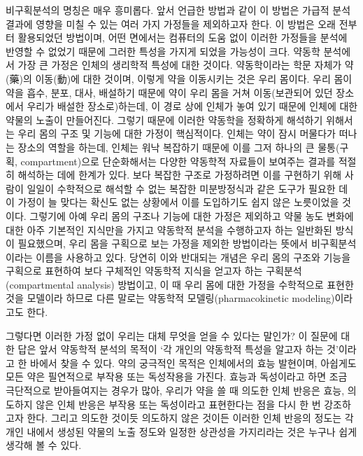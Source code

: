 \documentclass[
  11pt,
  krantz2, a4paper, twoside]{krantz}
\theoremstyle{definition}
\theoremstyle{definition}
\theoremstyle{definition}
\theoremstyle{definition}
\theoremstyle{remark}
\begin{document}
비구획분석의 명칭은 매우 흥미롭다.
앞서 언급한 방법과 같이 이 방법은 가급적 분석결과에 영향을 미칠 수 있는 여러 가지 가정들을 제외하고자 한다.
이 방법은 오래 전부터 활용되었던 방법이며, 어떤 면에서는 컴퓨터의 도움 없이 이러한 가정들을 분석에 반영할 수 없었기 때문에 그러한 특성을 가지게 되었을 가능성이 크다.
약동학 분석에서 가장 큰 가정은 인체의 생리학적 특성에 대한 것이다. 
약동학이라는 학문 자체가 약(藥)의 이동(動)에 대한 것이며, 이렇게 약을 이동시키는 것은 우리 몸이다. 
우리 몸이 약을 흡수, 분포, 대사, 배설하기 때문에 약이 우리 몸을 거쳐 이동(보관되어 있던 장소에서 우리가 배설한 장소로)하는데, 이 경로 상에 인체가 놓여 있기 때문에 인체에 대한 약물의 노출이 만들어진다.
그렇기 때문에 이러한 약동학을 정확하게 해석하기 위해서는 우리 몸의 구조 및 기능에 대한 가정이 핵심적이다. 
인체는 약이 잠시 머물다가 떠나는 장소의 역할을 하는데, 인체는 워낙 복잡하기 때문에 이를 그저 하나의 큰 물통(구획, compartment)으로 단순화해서는 다양한 약동학적 자료들이 보여주는 결과를 적절히 해석하는 데에 한계가 있다. 
보다 복잡한 구조로 가정하려면 이를 구현하기 위해 사람이 일일이 수학적으로 해석할 수 없는 복잡한 미분방정식과 같은 도구가 필요한 데 이 가정이 늘 맞다는 확신도 없는 상황에서 이를 도입하기도 쉽지 않은 노릇이었을 것이다.
그렇기에 아예 우리 몸의 구조나 기능에 대한 가정은 제외하고 약물 농도 변화에 대한 아주 기본적인 지식만을 가지고 약동학적 분석을 수행하고자 하는 일반화된 방식이 필요했으며, 우리 몸을 구획으로 보는 가정을 제외한 방법이라는 뜻에서 비구획분석이라는 이름을 사용하고 있다. 
당연히 이와 반대되는 개념은 우리 몸의 구조와 기능을 구획으로 표현하여 보다 구체적인 약동학적 지식을 얻고자 하는 구획분석(compartmental analysis) 방법이고, 이 때 우리 몸에 대한 가정을 수학적으로 표현한 것을 모델이라 하므로 다른 말로는 약동학적 모델링(pharmacokinetic modeling)이라고도 한다.

그렇다면 이러한 가정 없이 우리는 대체 무엇을 얻을 수 있다는 말인가?
이 질문에 대한 답은 앞서 약동학적 분석의 목적이 `각 개인의 약동학적 특성을 알고자 하는 것'이라고 한 바에서 찾을 수 있다. 
약의 궁극적인 목적은 인체에서의 효능 발현이며, 아쉽게도 모든 약은 필연적으로 부작용 또는 독성작용을 가진다.
효능과 독성이라고 하면 조금 극단적으로 받아들여지는 경우가 많아, 우리가 약을 쓸 때 의도한 인체 반응은 효능, 의도하지 않은 인체 반응은 부작용 또는 독성이라고 표현한다는 점을 다시 한 번 강조하고자 한다.
그리고 의도한 것이듯 의도하지 않은 것이든 이러한 인체 반응의 정도는 각 개인 내에서 생성된 약물의 노출 정도와 일정한 상관성을 가지리라는 것은 누구나 쉽게 생각해 볼 수 있다.
\end{document}
